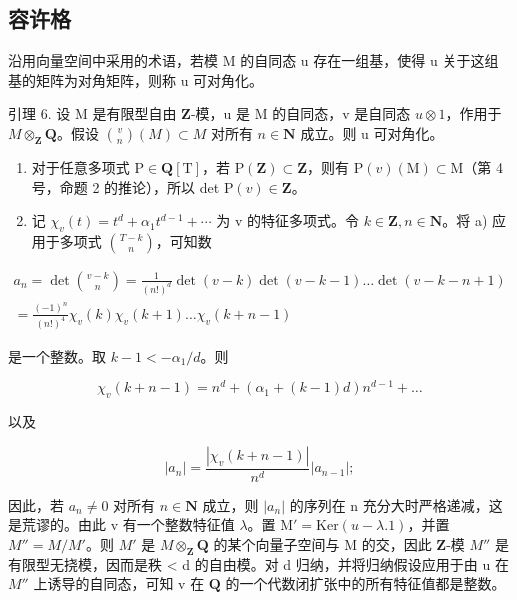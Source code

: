 \subsection{容许格}

沿用向量空间中采用的术语，若模 M 的自同态 u 存在一组基，使得 u 关于这组基的矩阵为对角矩阵，则称 u 可对角化。

引理 6. 设 M 是有限型自由 \(\mathbf{Z}\)-模，u 是 M 的自同态，v 是自同态 \(u \otimes 1\)，作用于 \(M \otimes_{\mathbf{Z}} \mathbf{Q}\)。假设 \(\binom{v}{n}(M) \subset M\) 对所有 \(n \in \mathbf{N}\) 成立。则 u 可对角化。

\begin{enumerate}
\def\labelenumi{\alph{enumi})}
\item
  对于任意多项式 \(\mathrm{P} \in \mathbf{Q}[\mathrm{T}]\)，若 \(\mathrm{P}(\mathbf{Z}) \subset \mathbf{Z}\)，则有 \(\mathrm{P}(v)(\mathrm{M}) \subset \mathrm{M}\)（第 4 号，命题 2 的推论），所以 det \(\mathrm{P}(v) \in \mathbf{Z}\)。
\item
  记 \(\chi_{v}(t)=t^{d}+\alpha_{1}t^{d-1}+\cdots\) 为 v 的特征多项式。令 \(k\in\mathbf{Z}, n\in\mathbf{N}\)。将 a) 应用于多项式 \(\binom{T-k}{n}\)，可知数
\end{enumerate}

\[
\begin{array}{l} a _ {n} = \det \binom {v - k} {n} = \frac {1}{(n !) ^ {d}} \det (v - k) \det (v - k - 1) \dots \det (v - k - n + 1) \\ = \frac {(- 1) ^ {n}}{(n !) ^ {4}} \chi_ {v} (k) \chi_ {v} (k + 1) \dots \chi_ {v} (k + n - 1) \end{array}
\]

是一个整数。取 \(k - 1 < -\alpha_{1} / d\)。则

\[
\chi_ {v} (k + n - 1) = n ^ {d} + (\alpha_ {1} + (k - 1) d) n ^ {d - 1} + \dots
\]

以及

\[
| a _ {n} | = \frac {| \chi_ {v} (k + n - 1) |}{n ^ {d}} | a _ {n - 1} |;
\]

因此，若 \(a_{n} \neq 0\) 对所有 \(n \in \mathbf{N}\) 成立，则 \(|a_{n}|\) 的序列在 n 充分大时严格递减，这是荒谬的。由此 v 有一个整数特征值 \(\lambda\)。置 \(\mathrm{M}' = \mathrm{Ker}(u - \lambda.1)\)，并置 \(M'' = M/M'\)。则 \(M'\) 是 \(M \otimes_{\mathbf{Z}} \mathbf{Q}\) 的某个向量子空间与 M 的交，因此 \(\mathbf{Z}\)-模 \(M''\) 是有限型无挠模，因而是秩 \textless{} d 的自由模。对 d 归纳，并将归纳假设应用于由 u 在 \(M''\) 上诱导的自同态，可知 v 在 \(\mathbf{Q}\) 的一个代数闭扩张中的所有特征值都是整数。

